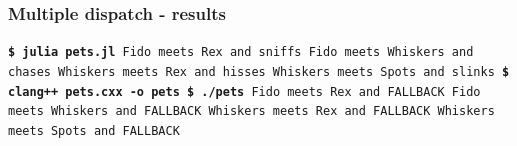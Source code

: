 \documentclass{beamer}
\def\\{}%
\begin{document}
\begin{frame}
    \frametitle{Multiple dispatch - results}
    {\tt {\bf \$ julia pets.jl} \\
    Fido meets Rex and sniffs \\
    Fido meets Whiskers and chases \\
    Whiskers meets Rex and hisses \\
    Whiskers meets Spots and slinks \\ \\
    {\bf\$ clang++ pets.cxx -o pets \\
    \$ ./pets}\\
    Fido meets Rex and FALLBACK \\
    Fido meets Whiskers and FALLBACK \\
    Whiskers meets Rex and FALLBACK \\
    Whiskers meets Spots and FALLBACK
    }

    

\end{frame}
\end{document}
